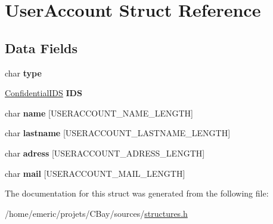 \hypertarget{struct_user_account}{\section{User\-Account Struct Reference}
\label{struct_user_account}
}
\subsection*{Data Fields}
\begin{DoxyCompactItemize}
\item 
\hypertarget{struct_user_account_aff17911edc8208aa8ddb1c7c52c78389}{char {\bfseries type}}\label{struct_user_account_aff17911edc8208aa8ddb1c7c52c78389}

\item 
\hypertarget{struct_user_account_a588d1e5ad85c65bc2b00e9432faadc0e}{\hyperlink{struct_confidential_i_d_s}{Confidential\-I\-D\-S} {\bfseries I\-D\-S}}\label{struct_user_account_a588d1e5ad85c65bc2b00e9432faadc0e}

\item 
\hypertarget{struct_user_account_ab3f0e8a7b7c292feb10bb01486452533}{char {\bfseries name} \mbox{[}U\-S\-E\-R\-A\-C\-C\-O\-U\-N\-T\-\_\-\-N\-A\-M\-E\-\_\-\-L\-E\-N\-G\-T\-H\mbox{]}}\label{struct_user_account_ab3f0e8a7b7c292feb10bb01486452533}

\item 
\hypertarget{struct_user_account_a570366d76c40b10dee4a3db834bc53be}{char {\bfseries lastname} \mbox{[}U\-S\-E\-R\-A\-C\-C\-O\-U\-N\-T\-\_\-\-L\-A\-S\-T\-N\-A\-M\-E\-\_\-\-L\-E\-N\-G\-T\-H\mbox{]}}\label{struct_user_account_a570366d76c40b10dee4a3db834bc53be}

\item 
\hypertarget{struct_user_account_accd59deb6270e807cd96a582c141e631}{char {\bfseries adress} \mbox{[}U\-S\-E\-R\-A\-C\-C\-O\-U\-N\-T\-\_\-\-A\-D\-R\-E\-S\-S\-\_\-\-L\-E\-N\-G\-T\-H\mbox{]}}\label{struct_user_account_accd59deb6270e807cd96a582c141e631}

\item 
\hypertarget{struct_user_account_aa9bbf7bea4117b927642aee2875821d9}{char {\bfseries mail} \mbox{[}U\-S\-E\-R\-A\-C\-C\-O\-U\-N\-T\-\_\-\-M\-A\-I\-L\-\_\-\-L\-E\-N\-G\-T\-H\mbox{]}}\label{struct_user_account_aa9bbf7bea4117b927642aee2875821d9}

\end{DoxyCompactItemize}


The documentation for this struct was generated from the following file\-:\begin{DoxyCompactItemize}
\item 
/home/emeric/projets/\-C\-Bay/sources/\hyperlink{structures_8h}{structures.\-h}\end{DoxyCompactItemize}
